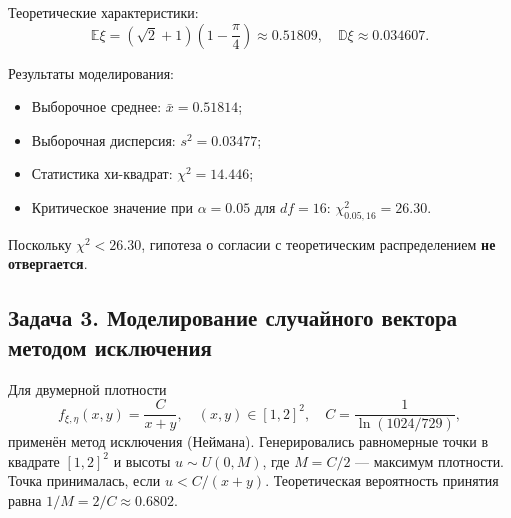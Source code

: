 \documentclass[bachelor, och, pract3]{SCWorks}
\begin{document}
Теоретические характеристики:
\[
\mathbb E\xi = (\sqrt2+1)\left(1-\frac{\pi}{4}\right) \approx 0.51809, \quad
\mathbb D\xi \approx 0.034607.
\]

Результаты моделирования:
\begin{itemize}
    \item Выборочное среднее: $\bar{x} = 0.51814$;
    \item Выборочная дисперсия: $s^2 = 0.03477$;
    \item Статистика хи-квадрат: $\chi^2 = 14.446$;
    \item Критическое значение при $\alpha=0.05$ для $df=16$: $\chi^2_{0.05,16} = 26.30$.
\end{itemize}
Поскольку $\chi^2 < 26.30$, гипотеза о согласии с теоретическим распределением \textbf{не отвергается}.

\subsection{Задача 3. Моделирование случайного вектора методом исключения}

Для двумерной плотности
\[
f_{\xi,\eta}(x,y)=\frac{C}{x+y}, \quad (x,y)\in[1,2]^2, \quad C = \frac{1}{\ln(1024/729)},
\]
применён метод исключения (Неймана). Генерировались равномерные точки в квадрате $[1,2]^2$ и высоты $u\sim U(0,M)$, где $M = C/2$ --- максимум плотности. Точка принималась, если $u < C/(x+y)$. Теоретическая вероятность принятия равна $1/M = 2/C \approx 0.6802$.
\end{document}
